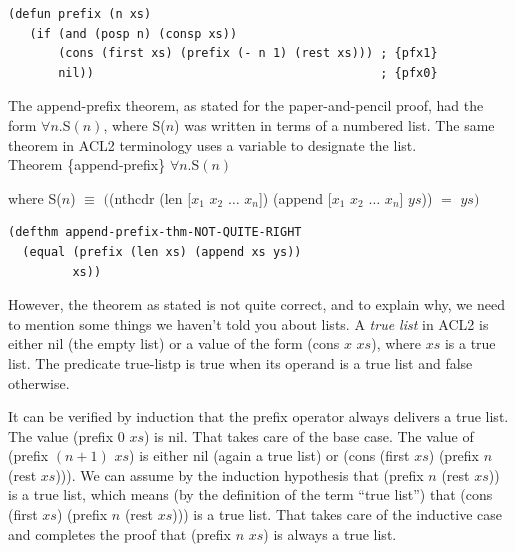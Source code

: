 \begin{code}
\begin{verbatim}
(defun prefix (n xs)
   (if (and (posp n) (consp xs))
       (cons (first xs) (prefix (- n 1) (rest xs))) ; {pfx1}
       nil))                                        ; {pfx0}
\end{verbatim}
\end{code}

The append-prefix theorem, as stated for the paper-and-pencil proof,
had the form $\forall n.$S$(n)$,
where S($n$)
was written in terms of a numbered list.
The same theorem in ACL2 terminology uses a variable to designate the list.
~\\

Theorem \{append-prefix\} $\forall n.$S$(n)$

where S($n$) $\equiv$ $($\textsf{(nthcdr (len [$x_1$ $x_2$ $\dots$ $x_n$]) (append [$x_1$ $x_2$ $\dots$ $x_n$] $ys$))} $=$ $ys)$

\begin{code}
\begin{verbatim}
(defthm append-prefix-thm-NOT-QUITE-RIGHT
  (equal (prefix (len xs) (append xs ys))
         xs))
\end{verbatim}
\end{code}

However, the theorem as stated
is not quite correct,
and to explain why, we need to mention
some things we haven't told you about lists. A
\label{true-list-def}\emph{true list}
in ACL2 is either \textsf{nil} (the empty list)
or a value of the form \textsf{(cons $x$ $xs$)},
where $xs$ is a true list.
The predicate
\textsf{true-listp}
is true when its operand
is a true list and false otherwise.

It can be verified by induction that
the \textsf{prefix} operator always delivers a true list.
The value \textsf{(prefix 0 $xs$)} is \textsf{nil}.
That takes care of the base case.
The value of \textsf{(prefix $(n+1)$ $xs$)} is either \textsf{nil}
(again a true list)
or \textsf{(cons (first $xs$) (prefix $n$ (rest $xs$)))}.
We can assume by the induction hypothesis that
\textsf{(prefix $n$ (rest $xs$))} is a true list,
which means (by the definition of the term ``true list'')
that \textsf{(cons (first $xs$) (prefix $n$ (rest $xs$)))} is a true list.
That takes care of the inductive case and completes the proof
that \textsf{(prefix $n$ $xs$)} is always a true list.

